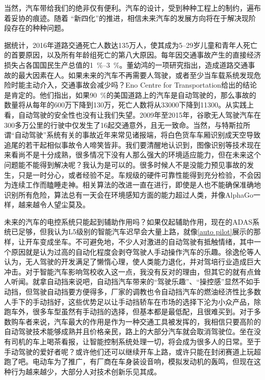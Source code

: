 \documentclass[UTF8]{ctexart}
\numberwithin{figure}{section}
\numberwithin{table}{section}
\begin{document}
当然，汽车带给我们的绝非仅有便利。汽车的设计，受到种种工程上的制约，遍布着妥协的痕迹。随着 “新四化”的推进，相信未来汽车的发展方向将在于解决现阶段存在的种种问题。

据统计，2016年道路交通死亡人数达135万人，使其成为\numrange[range-phrase = $\,\sim\,$]{5}{29}岁儿童和青年人死亡的首要原因，以及所有年龄组死亡的第八大原因。每年因交通事故产生的直接经济损失占各国国民生产总值的\qtyrange[range-phrase = $\,\sim\,$, range-units = single]{1}{3}{\percent}。董幼鸿的一项研究指出，造成道路交通事故的最大因素在人。如果未来的汽车不再需要人驾驶，或者至少当车载系统发现危险时能主动介入，交通事故会减少吗？Eno Centre for Transportation给出的结论是肯定的。他们指出，如果\SI{90}{\percent}的美国道路上的汽车是自动驾驶的，那么事故的数量将从每年的600万下降到130万，死亡人数将从\num[group-separator={,}]{33000}下降到\num[group-separator={,}]{11300}。从实践上看，自动驾驶的安全性也没有让我们失望。2009年至2015年，谷歌无人驾驶汽车在300多万公里的行驶中仅发生了16起交通意外，且无一致命。当然，与特斯拉所谓“自动驾驶”系统有关的事故近年来常见诸报端，将白色货车车厢识别成天空导致追尾的若干起相似事故令人啼笑皆非。我们要清醒地认识到，图像识别等技术现在来看尚不是十分成熟，很多情况下没有人那么强大的环境适应能力，但在未来这个问题能不能得到解决呢？我认为是可以的。很多时候人不是没能力预见事故的发生，只是一时分心，或者经验不足。车规级的硬件可靠性能得到充分检验，不会因为连续工作而瞌睡走神。相关算法的改进一直在进行，即使是人也不能确保准确地识别所有危险，算法总有一天会在环境感知方面的能力超过人类，并像AlphaGo一样，越来越令人望尘莫及。

未来的汽车的电控系统只能起到辅助作用吗？如果仅起辅助作用，现在的ADAS系统已足够，但我认为L5级别的智能汽车迟早会大量上路，就像\cref{auto pilot}展示的那样，让开车变成坐车。不可避免地，不少人对激进的自动驾驶有抵触情绪，其中一个原因就是认为过高的自动化程度会剥夺驾驶人手动操作汽车的乐趣。徐逸伦等人认为，无人驾驶的开发满足了懒惰心理，使人类能力退化，并对驾培行业造成巨大冲击。对于智能汽车影响驾校收入这一点，我没有反对的理由，但其它的就有点耸人听闻。就拿自动挡来说吧，自动挡汽车带来的“驾驶乐趣”、“操控感”显然不如手动挡，但驾驶自动挡要方便得多，厂家的调教也令自动挡汽车的燃油经济性比多数人手下的手动挡好，这些优势足以让手动挡轿车在市场的选择下沦为小众产品，除跑车外，很多车型虽然有手动挡的选择，但基本都是最低配，且很难买到。对于多数购车者来说，汽车最大的作用是作为一种交通工具被发挥的，我相信只要高阶的自动驾驶技术能够成熟并且价格亲民，路上的大部分汽车就会取消驾驶位。坐在没有司机的车上喝茶看报，让智能控制系统处理一切，将会成为很多人的日常。至于手动驾驶的爱好者呢？或许他们还可以继续开车上路，或许只能在封闭赛道上玩超跑了吧。电动车为了推广，有厂商在车身装设音响，模拟发动机的轰鸣，但现在这种行为越来越少，大部分人对技术创新乐见其成。
\end{document}
